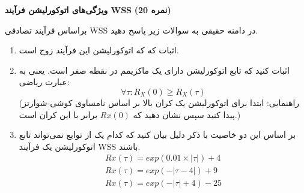 \Large \textbf{ویژگی‌های اتوکورلیشن فرآیند WSS}
\large \textbf{(20 نمره)}

\normalsize \vspace{0.5cm}
براساس فرآیند تصادفی WSS در دامنه حقیقی به سوالات زیر پاسخ دهید.
\begin{enumerate}[label=(\alph*)]
	\item
اثبات که که اتوکورلیشن این فرآیند زوج است.
	\item
اثبات کنید که تابع اتوکورلیشن دارای یک ماکزیمم در نقطه صفر است. یعنی به عبارت ریاضی:
$$
\forall \tau : R_{X}(0) \geqslant R_X(\tau)
$$
(راهنمایی: ابتدا برای اتوکورلیشن یک کران بالا بر اساس نامساوی کوشی-شوارتز پیدا کنید سپس نشان دهید که 
$ Rx(0) $
برابر با این کران است.)
	\item 
بر اساس این دو خاصیت با ذکر دلیل بیان کنید که کدام یک از توابع نمی‌تواند تابع اتوکورلیشن یک فرآیند WSS باشند.
$$
\begin{align*}
Rx(\tau) = exp(0.01 \times |\tau|) + 4 \\
Rx(\tau) = exp(-|\tau - 4|) + 9  \\
Rx(\tau) = exp(-|\tau| + 4) - 25 
\end{align*}
$$

\end{enumerate}


